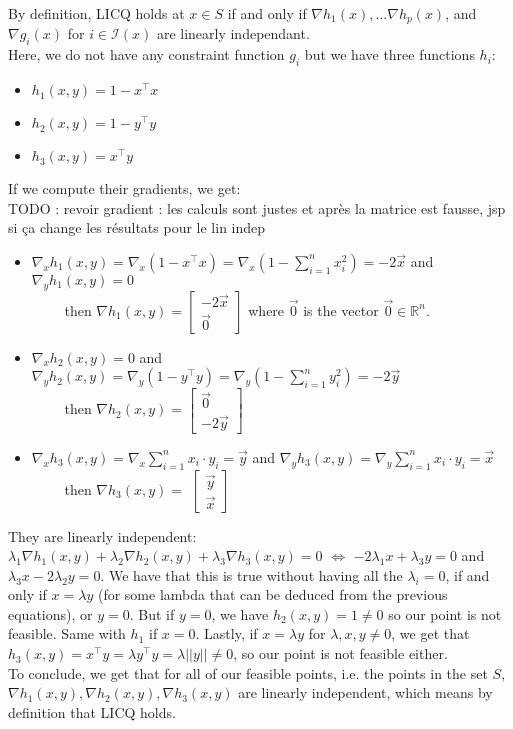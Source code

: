 \documentclass{article}
\newcommand{\R}{\mathbb{R}}
\newcommand{\tp}{^\top}
\begin{document}
By definition, LICQ holds at $x\in S$ if and only if $\nabla h_1(x),\dots\nabla h_p(x)$, and $\nabla g_i(x)$ for $i\in \mathcal I(x) $ are linearly independant.\\
Here, we do not have any constraint function $g_i$ but we have three functions $h_i$:
\begin{itemize}
\item  $h_1(x,y)=1-x\tp x$
\item $h_2(x,y)=1-y\tp y$
\item $h_3(x,y)= x\tp y$
\end{itemize} 
If we compute their gradients, we get:\\
TODO : revoir gradient : les calculs sont justes et après la matrice est fausse, jsp si ça change les résultats pour le lin indep
\begin{itemize}
\item  $\nabla_x h_1(x,y)=\nabla_x \left(1-x\tp x\right)= \nabla_x \left(1-\sum_{i=1}^n x_{i}^2 \right)=-2\vec x$  and $\nabla_y h_1(x,y)=0$ \\

$\qquad$ then $\nabla h_1(x,y)=
\begin{bmatrix}
-2 \vec{x}\\
\vec{0}
\end{bmatrix}
$ where $\vec{0}$ is the vector $\vec{0} \in \R^n$.
\item  $\nabla_x h_2(x,y)=0$ and $\nabla_y h_2(x,y)=\nabla_y \left(1-y\tp y\right)= \nabla_y \left(1-\sum_{i=1}^n y_{i}^2 \right)=-2\vec y$ \\

$\qquad$ then $\nabla h_2(x,y)=
\begin{bmatrix}
\vec{0}\\
-2 \vec{y}
\end{bmatrix}
$
\item $\nabla_x h_3(x,y)= \nabla_x \sum_{i=1}^n x_i \cdot y_i= \vec{y}$ and  $\nabla_y h_3(x,y)= \nabla_y \sum_{i=1}^n x_i \cdot y_i= \vec{x}$\\

$\qquad$ then $\nabla h_3(x,y)=$
$
\begin{bmatrix}
\vec{y}\\
\vec{x}
\end{bmatrix}
$
\end{itemize} 

\noindent They are linearly independent:\\
$\lambda_1 \nabla h_1(x,y)+\lambda_2\nabla h_2(x,y)+\lambda_3 \nabla h_3(x,y)=0 $ $\iff$ $- 2 \lambda_1 x + \lambda_3 y=0$ and  $\lambda_3 x -2 \lambda_2 y=0$. We have that this is true without having all the $\lambda_i=0$, if and only if $x=\lambda y$ (for some lambda that can be deduced from the previous equations), or $y=0$. But if $y=0$, we have $h_2(x,y)=1\neq 0$ so our point is not feasible. Same with $h_1$ if $x=0$. Lastly, if $x=\lambda y$ for $\lambda, x, y \neq 0$, we get that $h_3(x,y)=x\tp y=\lambda y\tp y=\lambda ||y|| \neq 0$, so our point is not feasible either.\\
To conclude, we get that for all of our feasible points, i.e. the points in the set $S$, $ \nabla h_1(x,y), \nabla h_2(x,y), \nabla h_3(x,y)$ are linearly independent, which means by definition that LICQ holds.
\end{document}
